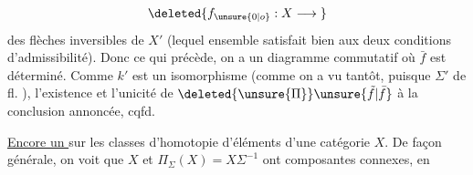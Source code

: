 \[\deleted{f_{\unsure{0|o}}:X\longrightarrow{}}\]
des flèches inversibles de $X'$ (lequel ensemble satisfait bien aux deux conditions d'admissibilité).
Donc  ce qui précède, on a un diagramme commutatif
où $\bar f$ est  déterminé. Comme $k'$ est un isomorphisme (comme on a vu tantôt, puisque $\Sigma'$  de fl. ), l'existence et l'unicité de $\deleted{\unsure{\Pi}}\unsure{\tilde f|\bar f}$  à la conclusion annoncée, cqfd.

\uline{Encore un } sur les classes d'homotopie d'éléments d'une catégorie $X$. De façon générale, on voit que  $X$ et $\Pi_\Sigma(X)=X\Sigma^{-1}$ ont   composantes connexes, en 

